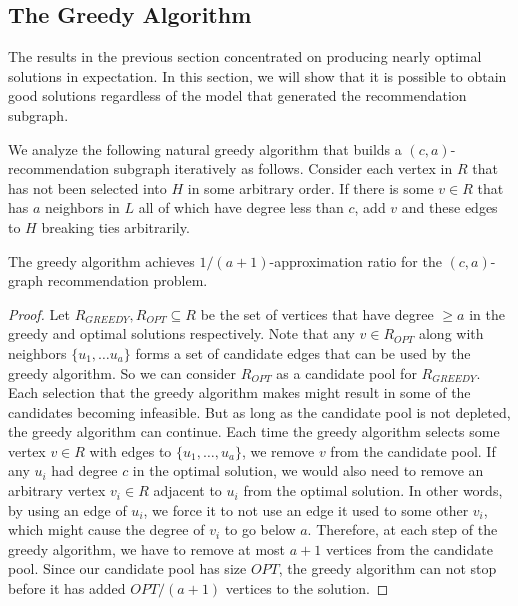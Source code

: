 \subsection{The Greedy Algorithm}
\label{greedy}
The results in the previous section concentrated on producing nearly
optimal solutions in expectation. In this section, we will show that
it is possible to obtain good solutions regardless of the model that
generated the recommendation subgraph. \vs

We analyze the following natural greedy algorithm
that builds a $(c,a)$-recommendation subgraph iteratively as follows. 
Consider each vertex in $R$ that has not been selected
into $H$ in some arbitrary order. If there is some $v \in R$ that has $a$ neighbors
in $L$ all of which have degree less than $c$, add $v$ and these edges to $H$ breaking
ties arbitrarily.

\begin{thm}
The greedy algorithm achieves $1/(a+1)$-approximation ratio for the $(c,a)$-graph
recommendation problem.
\end{thm}
\begin{proof}
Let $R_{GREEDY}, R_{OPT}\subseteq R$ be the set of vertices that have
degree $\geq a$ in the greedy and optimal solutions respectively. Note
that any $v \in R_{OPT}$ along with neighbors $\{u_1,\ldots u_a\}$
forms a set of candidate edges that can be used by the greedy
algorithm. So we can consider $R_{OPT}$ as a candidate pool for
$R_{GREEDY}$. Each selection that the greedy algorithm makes might result in
some of the candidates becoming infeasible. But as long as the candidate pool
is not depleted, the greedy algorithm can continue. 
Each time the greedy algorithm selects some vertex $v\in
R$ with edges to $\{u_1,\ldots, u_a\}$, we remove $v$ from the candidate pool. 
If any $u_i$ had degree $c$ in the optimal solution, we would also need to
remove an arbitrary vertex $v_i\in R$ adjacent to $u_i$ from the optimal
solution. In other words, by using an edge of $u_i$, we force it to
not use an edge it used to some other $v_i$, which might cause the
degree of $v_i$ to go below $a$. Therefore, at each step of
the greedy algorithm, we have to remove at most $a+1$ vertices from
the candidate pool. Since our candidate pool has size $OPT$, the
greedy algorithm can not stop before it has added $OPT/(a+1)$
vertices to the solution.
\end{proof}

